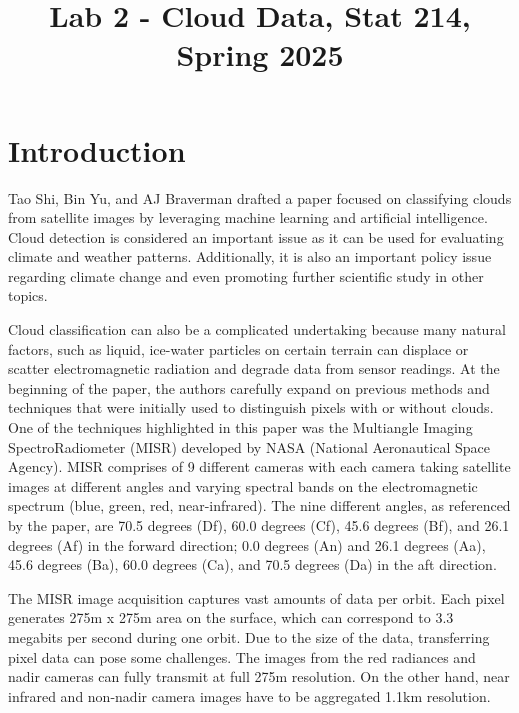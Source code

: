 \documentclass[10pt,letterpaper]{article}
\title{Lab 2 - Cloud Data, Stat 214, Spring 2025\vspace{-2em}}
\begin{document}
\maketitle


\section{Introduction}
Tao Shi, Bin Yu, and AJ Braverman drafted a paper focused on classifying clouds from satellite images by leveraging machine learning and artificial intelligence. Cloud detection is considered an important issue as it can be used for evaluating climate and weather patterns. Additionally, it is also an important policy issue regarding climate change and even promoting further scientific study in other topics.


Cloud classification can also be a complicated undertaking because many natural factors, such as liquid, ice-water particles on certain terrain can displace or scatter electromagnetic radiation and degrade data from sensor readings.  At the beginning of the paper, the authors carefully expand on previous methods and techniques that were initially used to distinguish pixels with or without clouds. One of the techniques highlighted in this paper was the Multiangle Imaging SpectroRadiometer (MISR) developed by NASA (National Aeronautical Space Agency). MISR comprises of 9 different cameras with each camera taking satellite images at different angles and varying spectral bands on the electromagnetic spectrum (blue, green, red, near-infrared). The nine different angles, as referenced by the paper, are 70.5 degrees (Df), 60.0 degrees (Cf), 45.6 degrees (Bf), and 26.1 degrees (Af) in the forward direction; 0.0 degrees (An) and 26.1 degrees (Aa), 45.6 degrees (Ba), 60.0 degrees (Ca), and 70.5 degrees (Da) in the aft direction.  


The MISR image acquisition captures vast amounts of data per orbit. Each pixel generates 275m x 275m area on the surface, which can correspond to 3.3 megabits per second during one orbit. Due to the size of the data, transferring pixel data can pose some challenges. The images from the red radiances and nadir cameras can fully transmit at full 275m resolution. On the other hand, near infrared and non-nadir camera images have to be aggregated 1.1km resolution. 
\end{document}
